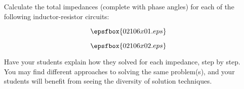 

Calculate the total impedances (complete with phase angles) for each of the following inductor-resistor circuits:

$$\epsfbox{02106x01.eps}$$







$$\epsfbox{02106x02.eps}$$







Have your students explain how they solved for each impedance, step by step.  You may find different approaches to solving the same problem(s), and your students will benefit from seeing the diversity of solution techniques.




